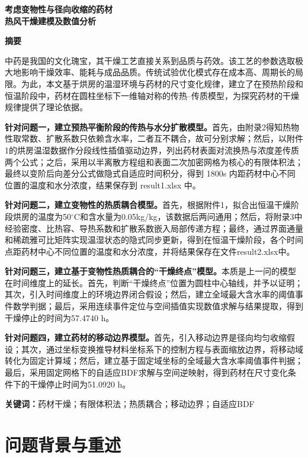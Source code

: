 \begin{center}
{\bfseries 考虑变物性与径向收缩的药材\\[5pt]热风干燥建模及数值分析}
\end{center}
\vspace{3pt}
\begin{center}\bfseries 摘\quad 要\end{center}

中药是我国的文化瑰宝，其干燥工艺直接关系到品质与药效。该工艺的参数选取极大地影响干燥效率、能耗与成品品质。传统试验优化模式存在成本高、周期长的局限。为此，本文基于烘房的温湿环境与药材的尺寸变化规律，建立了在预热阶段和恒温阶段中，药材在圆柱坐标下一维轴对称的传热–传质模型，为探究药材的干燥规律提供了理论依据。

\textbf{针对问题一，建立预热平衡阶段的传热与水分扩散模型。}首先，由附录2得知热物性取常数、扩散系数只依赖含水率，二者互不耦合，故可分别求解；然后，以附件1的烘房温湿数据作分段线性插值驱动边界，列出药材表面对流换热与浓度差传质两个公式；之后，采用以半离散方程组和表面二次加密网格为核心的有限体积法；最终以变阶后向差分公式做隐式自适应时间积分，得到 1800s 内距药材中心不同位置的温度和水分浓度，结果保存到 result1.xlsx 中。

\textbf{针对问题二，建立变物性的热质耦合模型。}首先，根据附件1，拟合出恒温干燥阶段烘房的温度为50$^\circ$C和含水量为0.05kg/kg，该数据后两问通用；然后，将附录3中经验密度、比热容、导热系数和扩散系数嵌入局部传递方程；最终，通过界面通量和稀疏雅可比矩阵实现温湿状态的隐式同步更新，得到在恒温干燥阶段，各个时间点距药材中心不同位置的温度和水分浓度，并将结果保存在文件result2.xlsx中。

\textbf{针对问题三，建立基于变物性热质耦合的“干燥终点”模型。}本质是上一问的模型在时间维度上的延长。首先，判断“干燥终点”位置为圆柱中心轴线，并予以证明；其次，引入时间维度上的环境边界闭合假设；然后，建立全域最大含水率的阈值事件数学判据；最后，采用连续事件定位与空间插值实现数值求解与结果提取，得到干燥停止的时间为57.4740 h。

\textbf{针对问题四，建立药材的移动边界模型。}首先，引入移动边界是径向均匀收缩假设；其次，通过坐标变换推导材料坐标系下的控制方程与表面缩放边界，将移动域转化为固定计算域；然后，建立基于固定域坐标的全域最大含水率阈值事件判据；最后，采用固定网格下的自适应BDF求解与空间逆映射，得到药材在尺寸变化条件下的干燥停止时间为51.0920 h。

\vspace{5pt}
\noindent\textbf{关键词：}药材干燥；有限体积法；热质耦合；移动边界；自适应BDF

\nextpage
\section{问题背景与重述}
